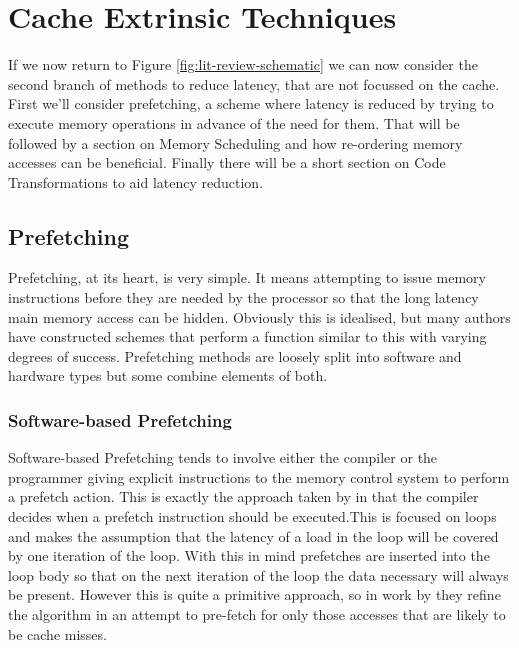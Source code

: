 \section{Cache Extrinsic Techniques}

If we now return to Figure \ref{fig:lit-review-schematic} we can now consider the second branch of methods to reduce latency, that are not focussed on the cache. First we'll consider prefetching, a scheme where latency is reduced by trying to execute memory operations in advance of the need for them. That will be followed by a section on Memory Scheduling and how re-ordering memory accesses can be beneficial. Finally there will be a short section on Code Transformations to aid latency reduction.

\subsection{Prefetching}

Prefetching, at its heart, is very simple. It means attempting to issue memory instructions before they are needed by the processor so that the long latency main memory access can be hidden. Obviously this is idealised, but many authors have constructed schemes that perform a function similar to this with varying degrees of success. Prefetching methods are loosely split into software and hardware types but some combine elements of both.

\subsubsection{Software-based Prefetching}

Software-based Prefetching tends to involve either the compiler or the programmer giving explicit instructions to the memory control system to perform a prefetch action. This is exactly the approach taken by \citet{callahanSoftwarePrefetching1991} in that the compiler decides when a prefetch instruction should be executed.This is focused on loops and makes the assumption that the latency of a load in the loop will be covered by one iteration of the loop. With this in mind prefetches are inserted into the loop body so that on the next iteration of the loop the data necessary will always be present. However this is quite a primitive approach, so in work by \citet{mowryDesignEvaluationCompiler1992} they refine the algorithm in an attempt to pre-fetch for only those accesses that are likely to be cache misses.  

